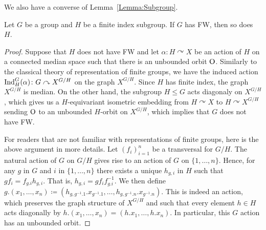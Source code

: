 We also have a converse of Lemma~\ref{Lemma:Subgroup}.
\begin{lem}\label{Lemma:Subgroup2}
Let $G$ be a group and $H$ be a finite index subgroup.
If $G$ has FW, then so does~$H$.
\end{lem}
\begin{proof}
Suppose that $H$ does not have FW and let $\alpha\colon H\curvearrowright X$ be an action of $H$ on a connected median space such that there is an unbounded orbit $\operatorname{O}$.
Similarly to the classical theory of representation of finite groups, we have the induced  action $\operatorname{Ind}_H^G(\alpha)\colon G \curvearrowright X^{G/H}$ on the graph $X^{G/H}$. Since $H$ has finite index, the graph $X^{G/H}$ is median. On the other hand, the subgroup $H\leq G$ acts diagonaly on $X^{G/H}$, which gives us a $H$-equivariant isometric embedding from $H\curvearrowright X$ to $H\curvearrowright X^{G/H}$ sending $\operatorname{O}$ to an unbounded $H$-orbit on $X^{G/H}$, which implies that $G$ does not have FW.

For readers that are not familiar with representations of finite groups, here is the above argument in more details.
Let $(f_i)_{i=1}^n$ be a transversal for $G/H$.
The natural action of $G$ on $G/H$ gives rise to an action of $G$ on $\{1,\dots,n\}$.
Hence, for any $g$ in $G$ and $i$ in $\{1,\dots,n\}$ there exists a unique $h_{g,i}$ in $H$ such that $gf_i=f_{g.i}h_{g,i}$. That is, $h_{g,i}=gf_if_{g.i}^{-1}$.
We then define $g.(x_1,\dots,x_n)\coloneqq(h_{g,g^{-1}.1}.x_{g^{-1}.1},\dots,h_{g,g^{-1}.n}.x_{g^{-1}.n})$. This is indeed an action, which preserves the graph structure of $X^{G/H}$ and such that every element $h\in H$ acts diagonally by $h.(x_1,\dots,x_n)=(h.x_1,\dots,h.x_n)$.
In particular, this $G$ action has an unbounded orbit.
\end{proof}







